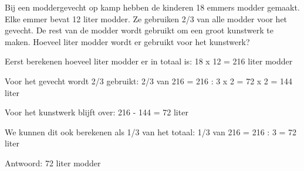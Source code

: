 \begin{opgave}
Bij een moddergevecht op kamp hebben de kinderen 18 emmers modder gemaakt. 
Elke emmer bevat 12 liter modder. Ze gebruiken 2/3 van alle modder voor het 
gevecht. De rest van de modder wordt gebruikt om een groot kunstwerk te maken. 
Hoeveel liter modder wordt er gebruikt voor het kunstwerk?
\end{opgave}

\begin{oplossing}
Eerst berekenen hoeveel liter modder er in totaal is:
18 x 12 = 216 liter modder

Voor het gevecht wordt 2/3 gebruikt:
2/3 van 216 = 216 : 3 x 2 = 72 x 2 = 144 liter

Voor het kunstwerk blijft over:
216 - 144 = 72 liter

We kunnen dit ook berekenen als 1/3 van het totaal:
1/3 van 216 = 216 : 3 = 72 liter

Antwoord: 72 liter modder
\end{oplossing}